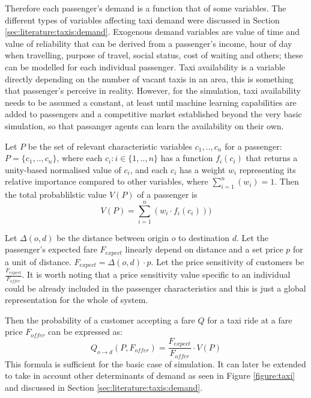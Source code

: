 Therefore each passenger's demand is a function that of some variables. The
different types of variables affecting taxi demand were discussed in Section
\ref{sec:literature:taxis:demand}. Exogenous demand variables are value of time
and value of reliability that can be derived from a passenger's income, hour of
day when travelling, purpose of travel, social status, cost of waiting and
others; these can be modelled for each individual passenger. Taxi availability
is a variable directly depending on the number of vacant taxis in an area, this
is something that passenger's perceive in reality. However, for the simulation,
taxi availability needs to be assumed a constant, at least until machine
learning capabilities are added to passengers and a competitive market
established beyond the very basic simulation, so that passanger agents can
learn the availability on their own.

Let \(P\) be the set of relevant characteristic variables \(c_1,..,c_n\) for a
passenger: \(P = \{c_1,..,c_n\}\), \newline
where each \(c_i : i \in \{1, .., n\}\) has a function \(f_i (c_i) \) that
returns a unity-based normalised value of \(c_i\), \newline
and each \(c_i\) has a weight \(w_i\) representing its relative importance
compared to other variables, where \(\sum_{i=1}^n (w_i) = 1 \). \newline
Then the total probablilstic value \(V(P)\) of a passenger is \[ V(P) =
\sum_{i=1}^{n} (w_i \cdot f_i(c_i) )) \] \newline

Let \(\Delta(o,d)\) be the distance between origin \(o\) to destination \(d\). 
\newline
Let the passenger's expected fare \(F_{expect}\) linearly depend on distance
and a set price \(p\) for a unit of distance. \(F_{expect} = \Delta(o,d) \cdot
p \). \newline
Let the price sensitivity of customers be \(\frac{F_{expect}}{F_{offer}}\). It
is worth noting that a price sensitivity value specific to an individual could
be already included in the passenger characteristics and this is just a global
representation for the whole of system. \newline

Then the probability of a customer accepting a fare \(Q\) for a taxi ride at a
fare price \(F_{offer}\) can be expressed as: 
\begin{equation} 
  \label{eq:requirements:demand}
  Q_{o \rightarrow d} (P,F_{offer}) = \frac{F_{expect}}{F_{offer}} \cdot V(P)
\end{equation}
This formula is sufficient for the basic case of simulation. It can later be
extended to take in account other determinants of demand as seen in Figure
\ref{figure:taxi} and discussed in Section \ref{sec:literature:taxis:demand}.


